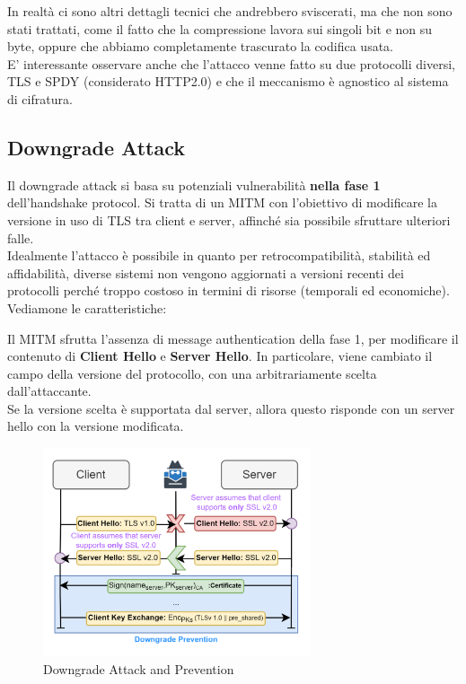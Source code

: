 \begin{note}
In realtà  ci sono altri dettagli tecnici che andrebbero sviscerati, ma che non sono stati trattati, come il fatto che la compressione lavora sui singoli bit e non su byte, oppure che abbiamo completamente trascurato la codifica usata.\\
E' interessante osservare anche che l'attacco venne fatto su due protocolli diversi, TLS e SPDY (considerato HTTP2.0) e che il meccanismo è agnostico al sistema di cifratura.
\end{note}
\subsection{Downgrade Attack}
Il downgrade attack si basa su potenziali vulnerabilità \textbf{nella fase 1} dell'handshake protocol. Si tratta di un MITM con l'obiettivo di modificare la versione in uso di TLS tra client e server, affinché sia possibile sfruttare ulteriori falle.\\
Idealmente l'attacco è possibile in quanto per retrocompatibilità, stabilità ed affidabilità, diverse sistemi non vengono aggiornati a versioni recenti dei protocolli perché troppo costoso in termini di risorse (temporali ed economiche). Vediamone le caratteristiche:
\begin{definition}\label{def:tlsdown}
Il MITM sfrutta l'assenza di message authentication della fase 1, per modificare il contenuto di \textbf{Client Hello} e \textbf{Server Hello}. In particolare, viene cambiato il campo della versione del protocollo, con una arbitrariamente scelta dall'attaccante.\\
Se la versione scelta è supportata dal server, allora questo risponde con un server hello con la versione modificata.
\end{definition}
\begin{figure}[h]
    \centering
    \includegraphics[width=0.7\textwidth]{image/tlsdown.png}
    \caption{Downgrade Attack and Prevention}
    \label{fig:tlsdown}
\end{figure}
